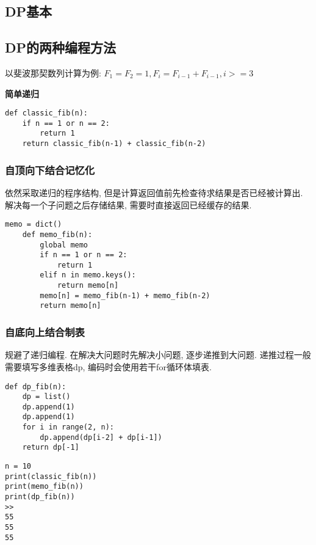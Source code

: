 \documentclass[../main]{subfiles}
\begin{document}
\begin{sloppy}


\section{DP基本}

\subsection{DP的两种编程方法}

以斐波那契数列计算为例: $F_1 = F_2 = 1, F_i = F_{i-1} + F_{i-1}, i >= 3$

\textbf{简单递归}

\begin{lstlisting}[style = Python]
def classic_fib(n):
    if n == 1 or n == 2:
        return 1
    return classic_fib(n-1) + classic_fib(n-2)
\end{lstlisting}

\subsubsection{自顶向下结合记忆化}

依然采取递归的程序结构, 但是计算返回值前先检查待求结果是否已经被计算出. 解决每一个子问题之后存储结果, 需要时直接返回已经缓存的结果.

\begin{lstlisting}[style = Python]
memo = dict()
    def memo_fib(n):
        global memo
        if n == 1 or n == 2:
            return 1
        elif n in memo.keys():
            return memo[n]
        memo[n] = memo_fib(n-1) + memo_fib(n-2)
        return memo[n]
\end{lstlisting}

\subsubsection{自底向上结合制表}

规避了递归编程. 在解决大问题时先解决小问题, 逐步递推到大问题. 递推过程一般需要填写多维表格dp, 编码时会使用若干for循环体填表.

\begin{lstlisting}[style = Python]
def dp_fib(n):
    dp = list()
    dp.append(1)
    dp.append(1)
    for i in range(2, n):
        dp.append(dp[i-2] + dp[i-1])
    return dp[-1]
\end{lstlisting}

\begin{verbatim}
n = 10
print(classic_fib(n))
print(memo_fib(n))
print(dp_fib(n))
>>
55
55
55
\end{verbatim}


\end{sloppy}
\end{document}
